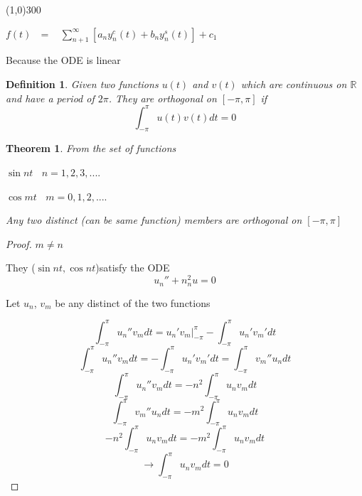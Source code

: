\documentclass[12pt]{article}
\newtheorem{definition}{Definition}[section]
\numberwithin{equation}{subsection}
\newtheorem{theorem}{Theorem}[section]
\newcommand{\indc}{\hspace{1.5cm}}
\newcommand{\inde}{\hspace{2.5cm}}
\newcommand{\indm}{\hspace{6.5cm}}
\begin{document}
\line(1,0){300}

\indc $\displaystyle f(t) \ \ \ = \ \ \ \ \sum_{n+1}^{\infty}[a_n y_n^c(t)+ b_n y_n^s(t)]+c_1 $

\inde Because the ODE is linear\\



\begin{definition}
Given two functions $u(t)$ and $v(t)$ which are continuous on $\mathbb{R}$ and have a period of $2\pi$.
They are orthogonal on $[-\pi , \pi]$ if 
\begin{equation}
\int_{-\pi}^{\pi} u(t)v(t) dt =0
\end{equation}
\end{definition}

\begin{theorem}
From the set of functions

\indm $ \sin nt \ \ \ \ n=1, 2, 3, .... $

\indm $ \cos mt \ \ \ \ m= 0, 1, 2, ....$

Any two distinct (can be same function) members are orthogonal on $[-\pi , \pi]$
\end{theorem}

\begin{proof} 
$m \neq n$

They ($\sin nt, \cos nt$)satisfy the ODE
\begin{equation}
u_n''+n_n^2u=0
\end{equation}

Let $u_n$, $v_m$ be any distinct of the two functions

\begin{equation}
\int_{-\pi}^{\pi} u_n''v_m dt = u_n'v_m\vert_{-\pi}^{\pi}- \int_{-\pi}^{\pi}u_n'v_m' dt 
\end{equation}
\begin{equation}
\int_{-\pi}^{\pi} u_n''v_m dt = - \int_{-\pi}^{\pi}u_n'v_m' dt = \int_{-\pi}^{\pi}v_m''u_n dt 
\end{equation}
\begin{equation}
\int_{-\pi}^{\pi} u_n''v_m dt = -n^2\int_{-\pi}^{\pi} u_n v_m dt
\end{equation}
\begin{equation}
\int_{-\pi}^{\pi} v_m''u_n dt = -m^2\int_{-\pi}^{\pi} u_n v_m dt
\end{equation}
\begin{equation}
-n^2\int_{-\pi}^{\pi} u_n v_m dt = -m^2\int_{-\pi}^{\pi} u_n v_m dt
\end{equation}
\begin{equation}
\rightarrow \int_{-\pi}^{\pi} u_n v_m dt =0
\end{equation}


\end{proof}
\newpage
\end{document}
